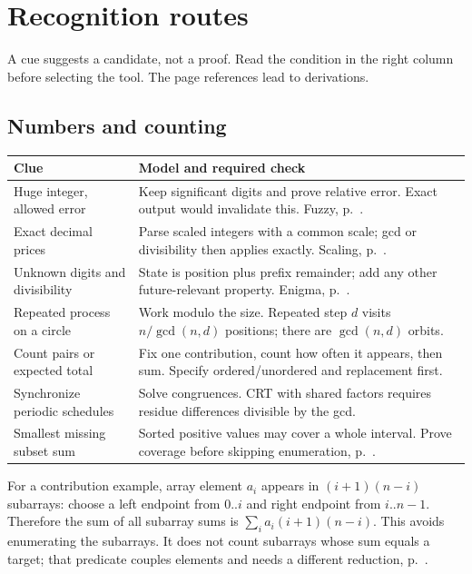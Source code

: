 \section{Recognition routes}
A cue suggests a candidate, not a proof. Read the condition in the right
column before selecting the tool. The page references lead to derivations.

\subsection{Numbers and counting}
\noindent\begin{tabular}{@{}p{}p{}@{}}
\textbf{Clue} & \textbf{Model and required check}\\\hline
Huge integer, allowed error & Keep significant digits and prove relative error. Exact output would invalidate this. Fuzzy, p.~\pageref{case:fuzzy}.\\
Exact decimal prices & Parse scaled integers with a common scale; gcd or divisibility then applies exactly. Scaling, p.~\pageref{case:orbits}.\\
Unknown digits and divisibility & State is position plus prefix remainder; add any other future-relevant property. Enigma, p.~\pageref{case:enigma}.\\
Repeated process on a circle & Work modulo the size. Repeated step $d$ visits $n/\gcd(n,d)$ positions; there are $\gcd(n,d)$ orbits.\\
Count pairs or expected total & Fix one contribution, count how often it appears, then sum. Specify ordered/unordered and replacement first.\\
Synchronize periodic schedules & Solve congruences. CRT with shared factors requires residue differences divisible by the gcd.\\
Smallest missing subset sum & Sorted positive values may cover a whole interval. Prove coverage before skipping enumeration, p.~\pageref{case:missing}.\\
\end{tabular}

For a contribution example, array element $a_i$ appears in $(i+1)(n-i)$
subarrays: choose a left endpoint from $0..i$ and right endpoint from
$i..n-1$. Therefore the sum of all subarray sums is
$\sum_i a_i(i+1)(n-i)$. This avoids enumerating the subarrays. It does not
count subarrays whose sum equals a target; that predicate couples elements
and needs a different reduction, p.~\pageref{case:exact-sum}.

